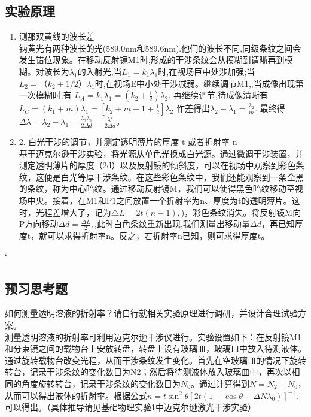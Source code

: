 \documentclass[dvipsnames, svgnames,a4paper,11pt]{article}
\begin{document}
	\subsection{实验原理}
	\begin{enumerate}
		\item 测那双黄线的波长差\\
		钠黄光有两种波长的光(589.0nm和589.6nm).他们的波长不同,同级条纹之间会发生错位现象。在移动反射镜M1时,形成的干涉条纹会从模糊到请晰再到模糊。对波长为$\lambda_{1}$的入射光,当$L_{1}=k_{1}\lambda_{1}$时,在视场巨中处涉加强;当$L_{2}=（k_{2}+1/2）\lambda_{1}$时,在视场E中小处干涉减弱。继续调节M1,,当成像出现第一次模糊时,有
	$L _{A}=k_{1}\lambda_{1}=(k_{2}+\frac{1}{2})\lambda_{2}.$
	再继续调节,待成像清晰有$L_{C}=(k_{1}+m)\lambda_{1}=[k_{2}+m-1+\frac{1}{2}]\lambda_{2}$
	作差得出$\lambda_{2}-\lambda_{1}=\frac{\lambda_{2}}{m}.$
	最终得$\Delta\lambda=\lambda_{2}-\lambda_{1}=\frac{\lambda_{2}\lambda_{1}}{2\Delta d}=\frac{\lambda^{2}}{2\Delta d}$。
		\item 2. 白光干涉的调节，并测定透明薄片的厚度 t 或者折射率 n \\
		基于迈克尔逊干涉实验，将光源从单色光换成白光源。通过微调干涉装置，并测定透明薄片的厚度（2d）以及反射镜的倾斜度，可以在视场中观察到彩色条纹，这便是白光等厚干涉条纹。在这些彩色条纹中，我们还能观察到一条全黑的条纹，称为中心暗纹。通过移动反射镜M，我们可以使得黑色暗纹移动至视场中央。接着，在M1和P1之间放置一个折射率为n、厚度为t的透明薄片。这时，光程差增大了，记为$\triangle L=2t(n-1),$)，彩色条纹消失。将反射镜M向P方向移动$\Delta d=\frac{\Delta L}{2},$,此时白色条纹重新出现,我们测量出移动量$\Delta d$，再已知厚度t，就可以求得折射率n。反之，若折射率n已知，则可求得厚度t。
		
	
		
	\end{enumerate}
	
	`
	
	\subsection{预习思考题}
	
	\begin{question}
		如何测量透明溶液的折射率？请自行就相关实验原理进行调研，并设计合理试验方案。\\ 
		测量透明溶液的折射率可利用迈克尔逊干涉仪进行。实验设置如下：在反射镜M1和分束镜之间的载物台上安放转盘，转盘上设有玻璃皿，玻璃皿中放入待测液体。通过旋转载物台改变光程，从而干涉条纹发生变化。首先在空玻璃皿的情况下旋转转台，记录干涉条纹的变化数目为N2；然后将待测液体放入玻璃皿中，再次以相同的角度旋转转台，记录干涉条纹的变化数目为$N_{0}$。通过计算得到$N=N_{2}-N_{0}$，从而可以得出液体的折射率。根据公式$n=t\sin^{2}\theta\left[2t\left(1-\cos\theta-\Delta N\lambda_{0}\right)\right]^{-1}.$可以得出。（具体推导请见基础物理实验1中迈克尔逊激光干涉实验）
	\end{question}
	
\end{document}
